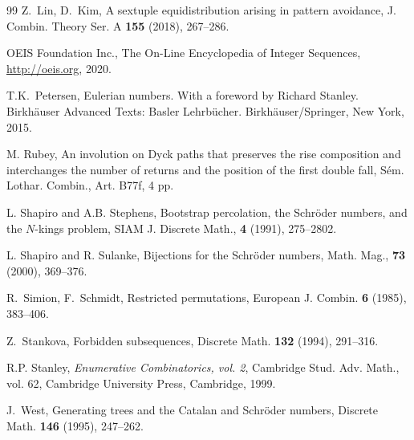\documentclass[12pt]{amsart}
\numberwithin{equation}{section}
\theoremstyle{plain}
\theoremstyle{definition}
\begin{document}
\begin{thebibliography}{99}
 Z.~Lin, D.~Kim, A sextuple equidistribution arising in pattern avoidance, J. Combin. Theory Ser. A {\bf 155} (2018), 267--286.

 OEIS Foundation Inc., The On-Line Encyclopedia of Integer Sequences,  \href{http://oeis.org}{http://oeis.org}, 2020.

 T.K.~Petersen, Eulerian numbers. With a foreword by Richard Stanley. Birkh\"auser Advanced Texts: Basler Lehrb\"ucher. Birkh\"auser/Springer, New York, 2015.

M. Rubey, An involution on Dyck paths that preserves the rise composition and interchanges the number of returns and the position of the first double fall, S\'em. Lothar. Combin., Art. B77f, 4 pp.

 L. Shapiro and A.B. Stephens, Bootstrap percolation, the Schr\"oder numbers, and the $N$-kings problem, SIAM J. Discrete Math., {\bf4} (1991), 275--2802.

 L. Shapiro and R. Sulanke, Bijections for the Schr\"oder numbers, Math. Mag., {\bf73} (2000), 369--376. 

 R.~Simion, F.~Schmidt, Restricted permutations, European J. Combin. {\bf6} (1985), 383--406.


 Z.~Stankova, Forbidden subsequences, Discrete Math. {\bf132} (1994), 291--316.


 R.P. Stanley, {\em Enumerative Combinatorics, vol. 2}, Cambridge Stud. Adv. Math., vol. 62, Cambridge University Press, Cambridge, 1999.


%


 J.~West, Generating trees and the Catalan and Schr\"oder numbers, Discrete Math. {\bf146} (1995), 247--262.

\end{thebibliography}
\end{document}
